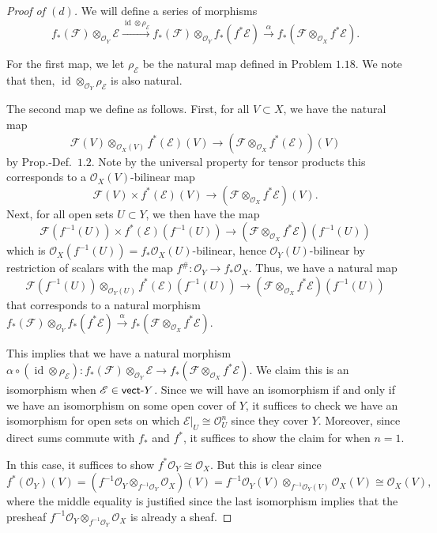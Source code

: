 \documentclass[12pt,letterpaper]{article}
\theoremstyle{definition}
\theoremstyle{remark}
\numberwithin{equation}{section}
\numberwithin{figure}{problem}
\DeclareMathOperator{\id}{id}
\newcommand{\EE}{\mathscr{E}}
\newcommand{\FF}{\mathscr{F}}
\newcommand{\OO}{\mathcal{O}}
\newcommand{\vect}{\mathsf{vect}\mathchar`-}
\begin{document}
\begin{proof}[Proof of $(d)$]
  We will define a series of morphisms
  \begin{equation*}
    f_*(\FF) \otimes_{\OO_Y} \EE \overset{\id\otimes\rho_\EE}{\longrightarrow} f_*(\FF) \otimes_{\OO_Y} f_*(f^*\EE) \overset{\alpha}{\longrightarrow} f_*(\FF \otimes_{\OO_X} f^*\EE).
  \end{equation*}
  \par For the first map, we let $\rho_\EE$ be the natural map defined in  Problem $1.18$. We note that then, $\id \otimes_{\OO_Y} \rho_\EE$ is also natural.
  \par The second map we define as follows. First, for all $V \subset X$, we have the natural map
  \begin{equation*}
    \FF(V) \otimes_{\OO_X(V)} f^*(\EE)(V) \to (\FF \otimes_{\OO_X} f^*(\EE))(V)
  \end{equation*}
  by Prop.-Def.~$1.2$. Note by the universal property for tensor products this corresponds to a $\OO_X(V)$-bilinear map
  \begin{equation*}
    \FF(V) \times f^*(\EE)(V) \to (\FF \otimes_{\OO_X} f^*\EE)(V).
  \end{equation*}
  Next, for all open sets $U \subset Y$, we then have the map
  \begin{equation*}
    \FF(f^{-1}(U)) \times f^*(\EE)(f^{-1}(U)) \to (\FF \otimes_{\OO_X} f^*\EE)(f^{-1}(U))
  \end{equation*}
  which is $\OO_X(f^{-1}(U)) = f_*\OO_X(U)$-bilinear, hence $\OO_Y(U)$-bilinear by restriction of scalars with the map $f^\#\colon\OO_Y \to f_*\OO_X$. Thus, we have a natural map
  \begin{equation*}
    \FF(f^{-1}(U)) \otimes_{\OO_Y(U)} f^*(\EE)(f^{-1}(U)) \to (\FF \otimes_{\OO_X} f^*\EE)(f^{-1}(U))
  \end{equation*}
  that corresponds to a natural morphism $f_*(\FF) \otimes_{\OO_Y} f_*(f^*\EE) \overset{\alpha}{\longrightarrow} f_*(\FF \otimes_{\OO_X} f^*\EE)$.
  \par This implies that we have a natural morphism $\alpha \circ (\id \otimes \rho_\EE)\colon f_*(\FF) \otimes_{\OO_Y} \EE \to f_*(\FF \otimes_{\OO_X} f^*\EE)$. We claim this is an isomorphism when $\EE \in \vect Y$. Since we will have an isomorphism if and only if we have an isomorphism on some open cover of $Y$, it suffices to check we have an isomorphism for open sets on which $\EE\vert_U \cong \OO_U^n$ since they cover $Y$. Moreover, since direct sums commute with $f_*$ and $f^*$, it suffices to show the claim for when $n = 1$.
  \par In this case, it suffices to show $f^*\OO_Y \cong \OO_X$. But this is clear since
  \begin{equation*}
    f^*(\OO_Y)(V) = (f^{-1}\OO_Y \otimes_{f^{-1}\OO_Y} \OO_X)(V) = f^{-1}\OO_Y(V) \otimes_{f^{-1}\OO_Y(V)} \OO_X(V) \cong \OO_X(V),
  \end{equation*}
  where the middle equality is justified since the last isomorphism implies that the presheaf $f^{-1}\OO_Y \otimes_{f^{-1}\OO_Y} \OO_X$ is already a sheaf.
\end{proof}
\end{document}

